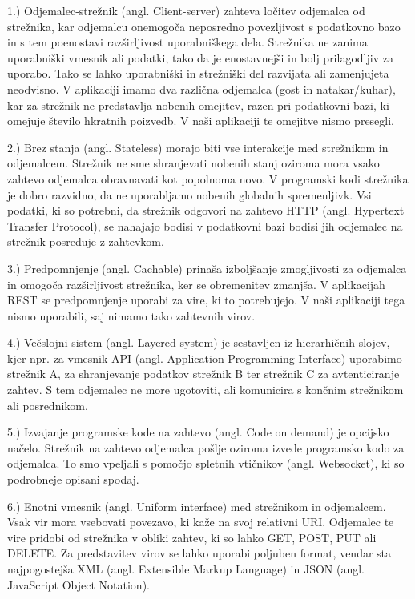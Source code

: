 \documentclass[a4paper, 12pt]{book}
\begin{document}
1.) Odjemalec-strežnik (angl. Client-server) zahteva ločitev odjemalca od strežnika, kar odjemalcu onemogoča neposredno povezljivost s podatkovno bazo in s tem poenostavi razširljivost uporabniškega dela. Strežnika ne zanima uporabniški vmesnik ali podatki, tako da je enostavnejši in bolj prilagodljiv za uporabo. Tako se lahko uporabniški in strežniški del razvijata ali zamenjujeta neodvisno. V aplikaciji imamo dva različna odjemalca (gost in natakar/kuhar), kar za strežnik ne predstavlja nobenih omejitev, razen pri podatkovni bazi, ki omejuje število hkratnih poizvedb. V naši aplikaciji te omejitve nismo presegli.

2.) Brez stanja (angl. Stateless) morajo biti vse interakcije med strežnikom in odjemalcem. Strežnik ne sme shranjevati nobenih stanj oziroma mora vsako zahtevo odjemalca obravnavati kot popolnoma novo. V programski kodi strežnika je dobro razvidno, da ne uporabljamo nobenih globalnih spremenljivk. Vsi podatki, ki so potrebni, da strežnik odgovori na zahtevo HTTP (angl. Hypertext Transfer Protocol), se nahajajo bodisi v podatkovni bazi bodisi jih odjemalec na strežnik posreduje z zahtevkom.

3.) Predpomnjenje (angl. Cachable) prinaša izboljšanje zmogljivosti za odjemalca in omogoča razširljivost strežnika, ker se obremenitev zmanjša. V aplikacijah REST se predpomnjenje uporabi za vire, ki to potrebujejo. V naši aplikaciji tega nismo uporabili, saj nimamo tako zahtevnih virov.

4.) Večslojni sistem (angl. Layered system) je sestavljen iz hierarhičnih slojev, kjer npr. za vmesnik API (angl. Application Programming Interface) uporabimo strežnik A, za shranjevanje podatkov strežnik B ter strežnik C za avtenticiranje zahtev. S tem odjemalec ne more ugotoviti, ali komunicira s končnim strežnikom ali posrednikom.

5.) Izvajanje programske kode na zahtevo (angl. Code on demand) je opcijsko načelo. Strežnik na zahtevo odjemalca pošlje oziroma izvede programsko kodo za odjemalca. To smo vpeljali s pomočjo spletnih vtičnikov (angl. Websocket), ki so podrobneje opisani spodaj.

6.) Enotni vmesnik (angl. Uniform interface) med strežnikom in odjemalcem. Vsak vir mora vsebovati povezavo, ki kaže na svoj relativni URI. Odjemalec te vire pridobi od strežnika v obliki zahtev, ki so lahko GET, POST, PUT ali DELETE. Za predstavitev virov se lahko uporabi poljuben format, vendar sta najpogostejša XML (angl. Extensible Markup Language) in JSON (angl. JavaScript Object Notation).
\end{document}
